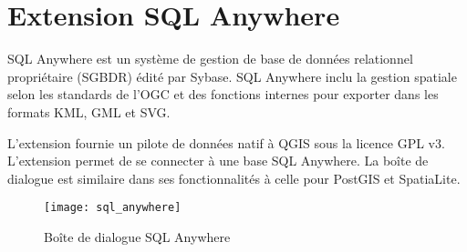 
\section{Extension SQL Anywhere}\label{sec:sqlanywhere}


SQL Anywhere est un système de gestion de base de données relationnel propriétaire (SGBDR) édité par Sybase. SQL Anywhere inclu la gestion spatiale selon les standards de l'OGC et des fonctions internes pour exporter dans les formats KML, GML et SVG.

L'extension  fournie un pilote de données natif à QGIS sous la licence GPL v3.  L'extension permet 
de se connecter à une base SQL Anywhere. La boîte de dialogue  est similaire dans ses fonctionnalités à celle pour PostGIS et SpatiaLite.

\begin{figure}[ht]
   \centering
   \texttt{[image: sql\_anywhere]}
   \caption{Boîte de dialogue SQL Anywhere \nixcaption}
   \label{fig:sqlanywhere}
\end{figure}

\FloatBarrier